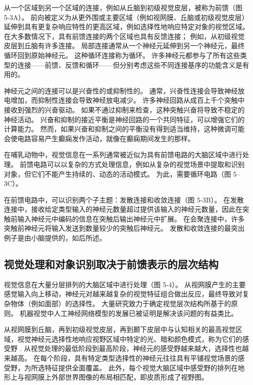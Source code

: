 从一个区域到另一个区域的连接，例如从丘脑到初级视觉皮层，被称为前馈（图 5-3A）。 前向被定义为从更外围或主要区域（例如视网膜、丘脑或初级视觉皮层）延伸到具有更复杂响应特性的更高区域，例如选择性地响应特定对象的视觉区域。 在大多数情况下，具有前馈连接的两个区域也具有反馈连接； 例如，从初级视觉皮层到丘脑有许多连接。 局部连接通常从一个神经元延伸到另一个神经元，最终循环回到原始神经元。 这种循环连接称为循环。 许多神经元都参与了所有这些类型的连接——前馈、反馈和循环——但分别考虑这些不同连接基序的功能含义是有用的。

神经元之间的连接可以是兴奋性的或抑制性的。 通常，兴奋性连接会导致神经放电增加，而抑制性连接会导致神经放电减少。 许多神经回路从成百上千个突触中接收到强烈的兴奋驱动。 如果不通过抑制来检查，这种突触兴奋将导致不稳定的神经活动。 兴奋和抑制的接近平衡是神经回路的一个共同特征，可以增强它们的计算能力。 然而，如果兴奋和抑制之间的平衡没有得到适当维持，这种微调可能会使电路容易产生癫痫发作活动，就像在癫痫期间发生的那样。

在哺乳动物中，视觉信息在一系列通常被近似为具有前馈电路的大脑区域中进行处理。 前馈电路可以以复杂的方式处理信息，例如从复杂的视觉场景中提取和识别对象，但它们不能产生持续的、动态的活动模式。 为此，需要循环电路（图 5–3C）。

在前馈电路中，可以识别两个子主题：发散连接和收敛连接（图 5-3B）。 在发散连接中，接收给定类型输入的神经元数量超过提供该输入的神经元数量，因此在突触前输入神经元中编码的信息在突触后输出神经元中扩展。 在会聚连接中，许多突触前神经元将输入发送到数量较少的突触后神经元。 发散和收敛连接的最突出例子是由小脑提供的，如后所述。


\subsection{视觉处理和对象识别取决于前馈表示的层次结构}
视觉信息在大量分层排列的大脑区域中进行处理（图 5-4）。 从视网膜产生的主要感觉输入向上移动，神经元对越来越复杂的视觉特征组合做出反应，最终导致对复杂物体（例如面部）的选择性。 大量研究致力于确定视觉层次结构所基于的原则。 机器视觉中人工神经网络模型的发展已被证明是解决该问题的有益类比。

从视网膜到丘脑，再到初级视觉皮层，再到颞下皮层中与认知相关的最高视觉区域，视觉神经元选择性地响应视野区域中特定的光、暗和颜色模式，称为它们的感受野 . 从视觉处理的最低阶段到最高阶段，神经元的感受野越来越大，选择性也越来越高。 在每个阶段，具有特定类型选择性的神经元往往具有平铺视觉场景的感受野，为所选特征提供全面覆盖。 此外，每个视觉大脑区域中感受野的排列在地形上与视网膜上外部世界图像的布局相匹配，即皮质形成了视野图。

